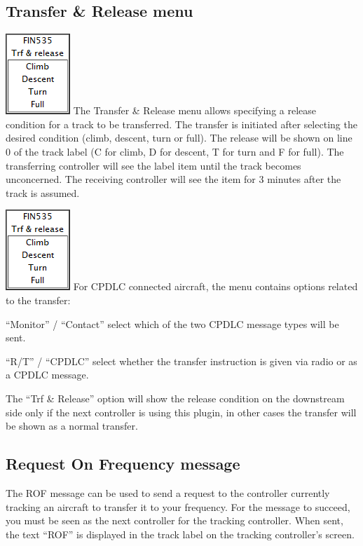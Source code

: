 \documentclass[11pt,a4paper,oldfontcommands]{memoir}
\newenvironment{Warn}
  {\begin{shaded}\marginnote{\fbox{Warning}}}
  {\end{shaded}}
\begin{document}
\subsection{Transfer \& Release menu}
\label{menu:xfrrel}
\includegraphics{img/xfrrel.png}
The Transfer \& Release menu allows specifying a release condition for a track to be
transferred. The transfer is initiated after selecting the desired condition (climb, descent,
turn or full). The release will be shown on line 0 of the track label (C for climb, D for
descent, T for turn and F for full). The transferring controller will see the label item until
the track becomes unconcerned. The receiving controller will see the item for 3 minutes
after the track is assumed.

\includegraphics{img/xfrrel.png}
For CPDLC connected aircraft, the menu contains options related to the transfer:

“Monitor” / “Contact” select which of the two CPDLC message types will be sent.

“R/T” / “CPDLC” select whether the transfer instruction is given via radio or as a CPDLC
message.

\begin{Warn}
The “Trf \& Release” option will show the release condition on the downstream side only if the
next controller is using this plugin, in other cases the transfer will be shown as a normal transfer.
\end{Warn}

\subsection{Request On Frequency message}
\label{menu:rof}

The ROF message can be used to send a request to the controller currently tracking an aircraft to transfer it
to your frequency. For the message to succeed, you must be seen as the next controller for the tracking
controller. When sent, the text “ROF” is displayed in the track label on the tracking controller’s screen.
\end{document}

